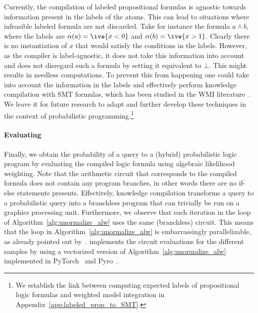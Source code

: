 Currently, the compilation of labeled propositional formulas is agnostic towards information present in the labels of the atoms. This can lead to situations where infeasible labeled formula are not discarded. Take for instance the formula $a \land b$, where the labels are $\alpha(a)=\ive{x<0}$ and $\alpha(b)=\ive{x>1}$. Clearly there is no instantiation of $x$ that would satisfy the conditions in the labels. However, as the compiler is label-agnostic, it does not take this information into account and does not disregard such a formula by setting it equivalent to $\bot$. This might results in needless computations. To prevent this from happening one could take into account the information in the labels and effectively perform knowledge compilation with SMT formulas, which has been studied in the WMI literature~\citep{sanner2011symbolic,kolb2018efficient,kolb2019exploit,derkinderen2020ordering}.
We leave it for future research to adapt and further develop these techniques in the context of probabilistic programming.\footnote{We establish the link between computing expected labels of propositional logic formulas and weighted model integration in  Appendix~\ref{app:labeled_prop_to_SMT}.}




\paragraph{\bf Evaluating} Finally, we obtain the probability of a query to a (hybrid) probabilistic logic program by evaluating the compiled logic formula using algebraic likelihood weighting.
Note that the arithmetic circuit that corresponds to the compiled formula does not contain any program branches, in other words there are no if-else statements presents. Effectively, knowledge compilation transforms a query to a probabilistic query into a branchless program that can trivially be run on a graphics processing unit. Furthermore, we observe that each iteration in the loop of Algorithm~\ref{alg:unormalize_alw} uses the same (branchless) circuit. This means that the loop in Algorithm~\ref{alg:unormalize_alw} is  embarrassingly parallelizable, as already pointed out by~\citet{zuidbergdosmartires2019exact}.
\dcproblogsys implements the circuit evaluations for the different samples by using a vectorized version of Algorithm~\ref{alg:unormalize_alw} implemented in PyTorch~\citep{paszke2019pytorch} and Pyro~\citep{bingham2019pyro}.









